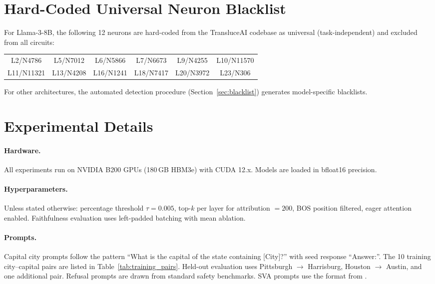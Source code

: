 \documentclass[11pt]{article}
\begin{document}
\section{Hard-Coded Universal Neuron Blacklist}
\label{sec:blacklist_appendix}

For Llama-3-8B, the following 12 neurons are hard-coded from the TransluceAI codebase as universal (task-independent) and excluded from all circuits:

\begin{center}
\begin{small}
\begin{tabular}{cccccc}
\toprule
L2/N4786 & L5/N7012 & L6/N5866 & L7/N6673 & L9/N4255 & L10/N11570 \\
L11/N11321 & L13/N4208 & L16/N1241 & L18/N7417 & L20/N3972 & L23/N306 \\
\bottomrule
\end{tabular}
\end{small}
\end{center}

For other architectures, the automated detection procedure (Section~\ref{sec:blacklist}) generates model-specific blacklists.

\section{Experimental Details}
\label{sec:exp_details}

\paragraph{Hardware.}
All experiments run on NVIDIA B200 GPUs (180\,GB HBM3e) with CUDA 12.x.
Models are loaded in bfloat16 precision.

\paragraph{Hyperparameters.}
Unless stated otherwise: percentage threshold $\tau{=}0.005$, top-$k$ per layer for attribution $= 200$, BOS position filtered, eager attention enabled.
Faithfulness evaluation uses left-padded batching with mean ablation.

\paragraph{Prompts.}
Capital city prompts follow the pattern ``What is the capital of the state containing [City]?'' with seed response ``Answer:''.
The 10 training city--capital pairs are listed in Table~\ref{tab:training_pairs}.
Held-out evaluation uses Pittsburgh $\to$ Harrisburg, Houston $\to$ Austin, and one additional pair.
Refusal prompts are drawn from standard safety benchmarks.
SVA prompts use the format from \citet{arora2025circuits}.
\end{document}
